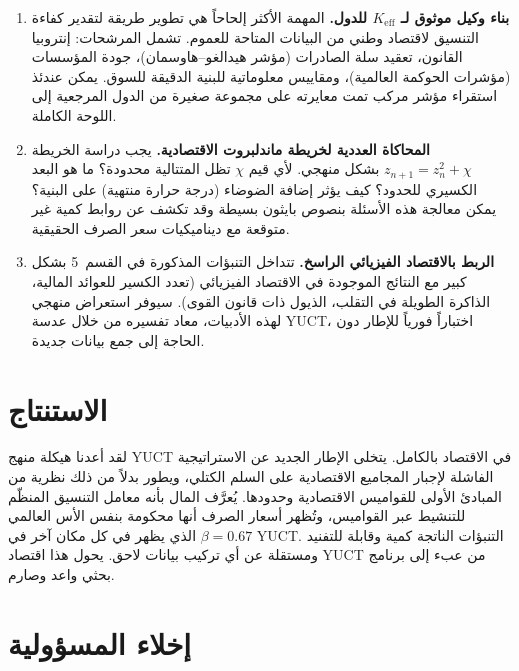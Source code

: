 \documentclass[12pt,a4paper]{article}
\theoremstyle{remark}
\begin{document}
	\begin{enumerate}[label=(\roman*)]
		\item \textbf{بناء وكيل موثوق لـ \(K_{\mathrm{eff}}\) للدول.} المهمة الأكثر إلحاحاً هي تطوير طريقة لتقدير كفاءة التنسيق لاقتصاد وطني من البيانات المتاحة للعموم. تشمل المرشحات: إنتروبيا القانون، تعقيد سلة الصادرات (مؤشر هيدالغو–هاوسمان)، جودة المؤسسات (مؤشرات الحوكمة العالمية)، ومقاييس معلوماتية للبنية الدقيقة للسوق. يمكن عندئذ استقراء مؤشر مركب تمت معايرته على مجموعة صغيرة من الدول المرجعية إلى اللوحة الكاملة.
		
		\item \textbf{المحاكاة العددية لخريطة ماندلبروت الاقتصادية.} يجب دراسة الخريطة \(z_{n+1} = z_n^2 + \chi\) بشكل منهجي. لأي قيم \(\chi\) تظل المتتالية محدودة؟ ما هو البعد الكسيري للحدود؟ كيف يؤثر إضافة الضوضاء (درجة حرارة منتهية) على البنية؟ يمكن معالجة هذه الأسئلة بنصوص بايثون بسيطة وقد تكشف عن روابط كمية غير متوقعة مع ديناميكيات سعر الصرف الحقيقية.
		
		\item \textbf{الربط بالاقتصاد الفيزيائي الراسخ.} تتداخل التنبؤات المذكورة في القسم~5 بشكل كبير مع النتائج الموجودة في الاقتصاد الفيزيائي (تعدد الكسير للعوائد المالية، الذاكرة الطويلة في التقلب، الذيول ذات قانون القوى). سيوفر استعراض منهجي لهذه الأدبيات، معاد تفسيره من خلال عدسة YUCT، اختباراً فورياً للإطار دون الحاجة إلى جمع بيانات جديدة.
	\end{enumerate}
	
	\section{الاستنتاج}
	
	لقد أعدنا هيكلة منهج YUCT في الاقتصاد بالكامل. يتخلى الإطار الجديد عن الاستراتيجية الفاشلة لإجبار المجاميع الاقتصادية على السلم الكتلي، ويطور بدلاً من ذلك نظرية من المبادئ الأولى للقواميس الاقتصادية وحدودها. يُعرَّف المال بأنه معامل التنسيق المنظّم للتنشيط عبر القواميس، وتُظهر أسعار الصرف أنها محكومة بنفس الأس العالمي \(\beta = 0.67\) الذي يظهر في كل مكان آخر في YUCT. التنبؤات الناتجة كمية وقابلة للتفنيد ومستقلة عن أي تركيب بيانات لاحق. يحول هذا اقتصاد YUCT من عبء إلى برنامج بحثي واعد وصارم.
	
	\section*{إخلاء المسؤولية}
	
\end{document}
